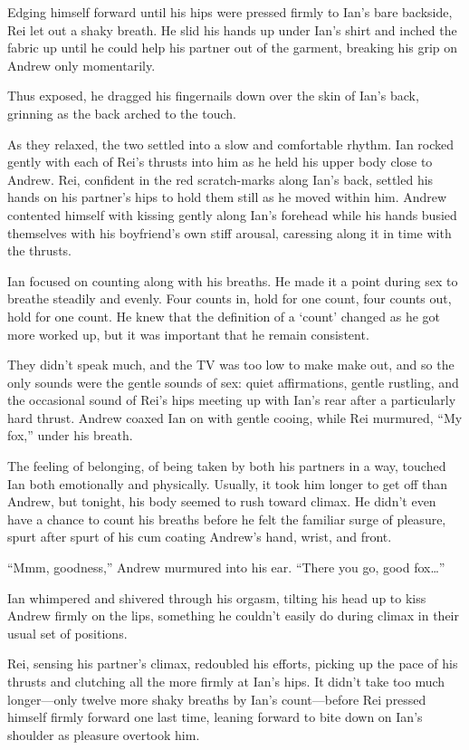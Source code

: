 Edging himself forward until his hips were pressed firmly to Ian's bare backside, Rei let out a shaky breath. He slid his hands up under Ian's shirt and inched the fabric up until he could help his partner out of the garment, breaking his grip on Andrew only momentarily.

Thus exposed, he dragged his fingernails down over the skin of Ian's back, grinning as the back arched to the touch.

As they relaxed, the two settled into a slow and comfortable rhythm. Ian rocked gently with each of Rei's thrusts into him as he held his upper body close to Andrew. Rei, confident in the red scratch-marks along Ian's back, settled his hands on his partner's hips to hold them still as he moved within him. Andrew contented himself with kissing gently along Ian's forehead while his hands busied themselves with his boyfriend's own stiff arousal, caressing along it in time with the thrusts.

Ian focused on counting along with his breaths. He made it a point during sex to breathe steadily and evenly. Four counts in, hold for one count, four counts out, hold for one count. He knew that the definition of a `count' changed as he got more worked up, but it was important that he remain consistent.

They didn't speak much, and the TV was too low to make make out, and so the only sounds were the gentle sounds of sex: quiet affirmations, gentle rustling, and the occasional sound of Rei's hips meeting up with Ian's rear after a particularly hard thrust. Andrew coaxed Ian on with gentle cooing, while Rei murmured, ``My fox,'' under his breath.

The feeling of belonging, of being taken by both his partners in a way, touched Ian both emotionally and physically. Usually, it took him longer to get off than Andrew, but tonight, his body seemed to rush toward climax. He didn't even have a chance to count his breaths before he felt the familiar surge of pleasure, spurt after spurt of his cum coating Andrew's hand, wrist, and front.

``Mmm, goodness,'' Andrew murmured into his ear. ``There you go, good fox\ldots{}''

Ian whimpered and shivered through his orgasm, tilting his head up to kiss Andrew firmly on the lips, something he couldn't easily do during climax in their usual set of positions.

Rei, sensing his partner's climax, redoubled his efforts, picking up the pace of his thrusts and clutching all the more firmly at Ian's hips. It didn't take too much longer---only twelve more shaky breaths by Ian's count---before Rei pressed himself firmly forward one last time, leaning forward to bite down on Ian's shoulder as pleasure overtook him.

